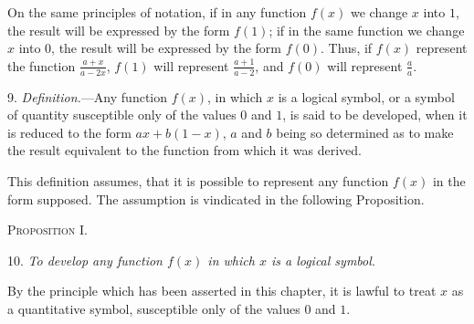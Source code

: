 \documentclass[oneside]{book}
\begin{document}
On the same principles of notation, if in any function $f\left(x\right)$
we change $x$ into $1$, the result will be expressed by the form
$f\left(1\right)$; if in the same function we change $x$ into $0$, the result will
be expressed by the form $f\left(0\right)$. Thus, if $f\left(x\right)$ represent the
function $\frac{a + x}{a - 2x}$, $f\left(1\right)$ will represent $\frac{a + 1}{a - 2}$, and $f\left(0\right)$ will represent
$\frac{a}{a}$.

9. \textit{Definition.}---Any function $f\left(x\right)$, in which $x$ is a logical
symbol, or a symbol of quantity susceptible only of the values
$0$ and $1$, is said to be developed, when it is reduced to the form
$ax + b\left(1-x\right)$, $a$ and $b$ being so determined as to make the result
equivalent to the function from which it was derived.

This definition assumes, that it is possible to represent any
function $f\left(x\right)$ in the form supposed. The assumption is vindicated
in the following Proposition.

\begin{center}
\textsc{Proposition I.}
\end{center}

10. \textit{To develop any function $f\left(x\right)$ in which $x$ is a logical symbol.}

By the principle which has been asserted in this chapter, it
is lawful to treat $x$ as a quantitative symbol, susceptible only of
the values $0$ and $1$.
\end{document}
